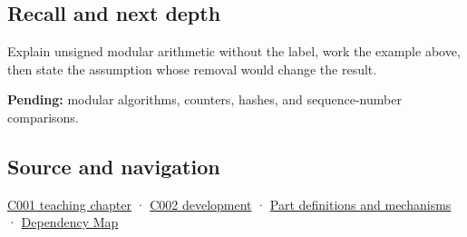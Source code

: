 \subsection{Recall and next depth}\label{appendix-c99977d88b33-recall-and-next-depth}

Explain unsigned modular arithmetic without the label, work the example above, then state the assumption whose removal would change the result.

\textbf{Pending:} modular algorithms, counters, hashes, and sequence-number comparisons.

\subsection{Source and navigation}\label{appendix-c99977d88b33-source-and-navigation}

\hyperref[01-foundations-i-ch001-from-a-signal-to-an-interpretation]{C001 teaching chapter} · \hyperref[01-foundations-i-ch001-arithmetic-becomes-a-policy]{C002 development} · \hyperref[appendix-fd090d982a15]{Part definitions and mechanisms} · \hyperref[appendix-4ad47bdd269a]{Dependency Map}
